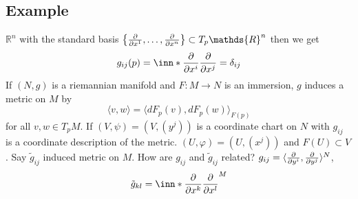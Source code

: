 \documentclass[a4paper]{article}
\begin{document}
\subsection*{Example}%
$\mathds{R}^n$ with the standard basis $\left\{ \pdv{}{x^1}, \dots, \pdv{}{x^n} \right\} \subset T_p\mathds{R}^n$ then we get
\[
  g_{ij}(p) = \inn*{\pdv{}{x^i}}{\pdv{}{x^j}} = \delta_{ij}
\]
If $(N,g)$ is a riemannian manifold and $F: M \rightarrow N$ is an immersion, $g$ induces a metric on $M$ by
\[
  \langle v, w \rangle = \langle dF_p(v), dF_p(w) \rangle_{F(p)}
\]
for all $v,w \in T_pM$. If $(V, \psi) = (V, (y^j))$ is a coordinate chart on $N$ with $g_{ij}$ is a coordinate description of the metric. $(U, \varphi) = (U, (x^j))$ and $F(U) \subset V$. Say $\tilde{g}_{ij}$ induced metric on $M$. How are $g_{ij}$ and $\tilde{g}_{ij}$ related? $g_{ij} = \langle \pdv{}{y^i}, \pdv{}{y^j}\rangle^N$,
\[
  \tilde{g}_{kl} = \inn*{\pdv{}{x^k}}{\pdv{}{x^l}}^M 
\]
\end{document}

